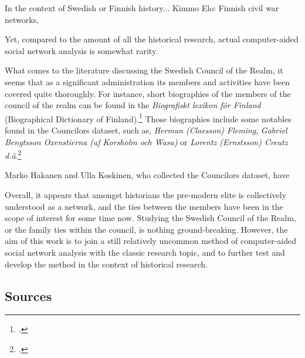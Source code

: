 \documentclass[a4paper,12pt]{article}
\begin{document}
In the context of Swedish or Finnish history... Kimmo Elo: Finnish civil war networks, 

Yet, compared to the amount of all the historical research, actual computer-aided social network analysis is somewhat rarity.

What comes to the literature discussing the Swedish Council of the Realm, it seems that as a significant administration its members and activities have been covered quite thoroughly. For instance, short biographies of the members of the council of the realm can be found in the \textit{Biografiskt lexikon för Finland} (Biographical Dictionary of Finland).\footcite{blf} Those biographies include some notables found in the Councilors dataset, such as, \textit{Herman (Claesson) Fleming}, \textit{Gabriel Bengtsson Oxenstierna (af Korsholm och Wasa)} or \textit{Lorentz (Ernstsson) Creutz d.ä}.\footcite{blf-list} 


 Marko Hakanen and Ulla Koskinen, who collected the Councilors dataset, have 
 
 Overall, it appears that amongst historians the pre-modern elite is collectively understood as a network, and the ties between the members have been in the scope of interest for some time now. Studying the Swedish Council of the Realm, or the family ties within the council, is nothing ground-breaking. However, the aim of this work is to join a still relatively uncommon method of computer-aided social network analysis with the classic research topic, and to further test and develop the method in the context of historical research. 

\subsection{Sources}
\end{document}
